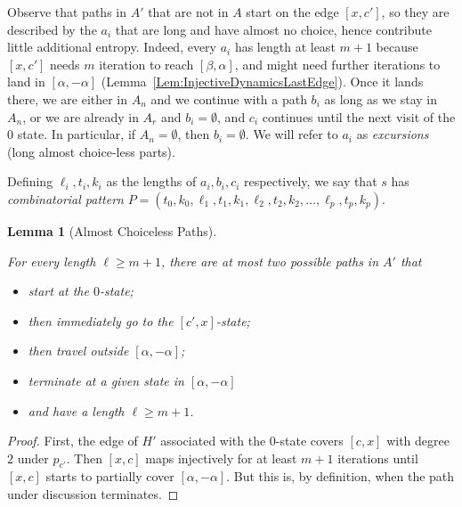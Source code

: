 \documentclass[12pt]{amsart}
\newcommand{\0}{\texttt{0}}
\newcommand{\1}{\texttt{1}}
\newtheorem{lemma}[theorem]{Lemma}
\theoremstyle{definition}
\numberwithin{equation}{section}
\newcommand{\lineclear}{\rule{0pt}{2pt}\newline}
\begin{document}
Observe that paths in $A'$ that are not in $A$ start on the edge $[x,c']$, so they are described by the $a_i$ that are long and have almost no choice, hence contribute little additional entropy. Indeed, every $a_i$ has length at least $m+1$ because $[x,c']$ needs $m$ iteration to reach $[\beta,\alpha]$, and might need further iterations to land in $[\alpha,-\alpha]$ (Lemma~\ref{Lem:InjectiveDynamicsLastEdge}). Once it lands there, we are either in $A_n$ and we continue with a path $b_i$ as long as we stay in $A_n$, or we are already in $A_r$ and $b_i=\emptyset$, and $c_i$ continues until the next visit of the $0$ state. In particular, if $A_n=\emptyset$, then $b_i=\emptyset$. 
We will refer to $a_i$ as \emph{excursions} (long almost choice-less parts).


Defining $\ell_i,t_i, k_i$ as the lengths of $a_i, b_i, c_i$ respectively,  we say that $s$ has \emph{combinatorial pattern} $P=(t_0,k_0,\ell_1,t_1,k_1,\ell_2,t_2,k_2,\dots,\ell_p,t_p,k_p)$.


\begin{lemma}[Almost Choiceless Paths]
\label{lem:ChoiceLessPaths} \lineclear
For every length $\ell\ge m+1$, there are at most two possible paths in $A'$ that 
\begin{itemize}
\item start at the $0$-state;
\item then immediately go to the $[c',x]$-state;
\item then travel outside $[\alpha,-\alpha]$; 
\item terminate at a given state in $[\alpha,-\alpha]$
\item and have a length $\ell\ge m+1$.
\end{itemize}
\end{lemma}
\begin{proof}
First, the edge of $H'$ associated with the $0$-state covers $[c,x]$ with degree $2$ under $p_{c'}$. Then $[x,c]$ maps injectively for at least $m+1$ iterations until $[x,c]$ starts to partially cover $[\alpha,-\alpha]$. But this is, by definition, when the path under discussion terminates.
\end{proof}

\end{document}
